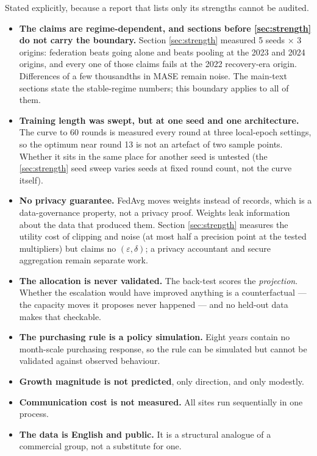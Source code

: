 \documentclass[11pt,a4paper]{article}
\begin{document}
Stated explicitly, because a report that lists only its strengths cannot be audited.

\begin{itemize}[leftmargin=1.3em]
\item \textbf{The claims are regime-dependent, and sections before \ref{sec:strength} do not carry
the boundary.} Section \ref{sec:strength} measured 5 seeds $\times$ 3 origins: federation beats
going alone and beats pooling at the 2023 and 2024 origins, and every one of those claims fails at
the 2022 recovery-era origin. Differences of a few thousandths in MASE remain noise. The main-text
sections state the stable-regime numbers; this boundary applies to all of them.

\item \textbf{Training length was swept, but at one seed and one architecture.} The curve to 60
rounds is measured every round at three local-epoch settings, so the optimum near round 13 is not an
artefact of two sample points. Whether it sits in the same place for another seed is untested (the
\ref{sec:strength} seed sweep varies seeds at fixed round count, not the curve itself).

\item \textbf{No privacy guarantee.} FedAvg moves weights instead of records, which is a
data-governance property, not a privacy proof. Weights leak information about the data that produced
them. Section \ref{sec:strength} measures the utility cost of clipping and noise (at most half a
precision point at the tested multipliers) but claims no $(\varepsilon,\delta)$; a privacy
accountant and secure aggregation remain separate work.

\item \textbf{The allocation is never validated.} The back-test scores the \emph{projection}. Whether
the escalation would have improved anything is a counterfactual --- the capacity moves it proposes
never happened --- and no held-out data makes that checkable.

\item \textbf{The purchasing rule is a policy simulation.} Eight years contain no month-scale
purchasing response, so the rule can be simulated but cannot be validated against observed behaviour.

\item \textbf{Growth magnitude is not predicted}, only direction, and only modestly.

\item \textbf{Communication cost is not measured.} All sites run sequentially in one process.

\item \textbf{The data is English and public.} It is a structural analogue of a commercial group, not
a substitute for one.
\end{itemize}
\end{document}
